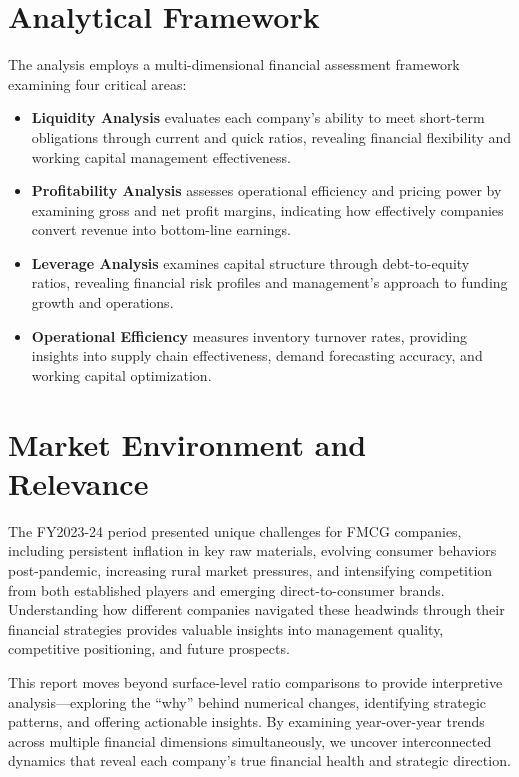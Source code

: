 \documentclass[12pt, a4paper]{report}
\begin{document}
\section{Analytical Framework}

The analysis employs a multi-dimensional financial assessment framework examining four critical areas:

\begin{itemize}
    \item \textbf{Liquidity Analysis} evaluates each company's ability to meet short-term obligations through current and quick ratios, revealing financial flexibility and working capital management effectiveness.
    
    \item \textbf{Profitability Analysis} assesses operational efficiency and pricing power by examining gross and net profit margins, indicating how effectively companies convert revenue into bottom-line earnings.
    
    \item \textbf{Leverage Analysis} examines capital structure through debt-to-equity ratios, revealing financial risk profiles and management's approach to funding growth and operations.
    
    \item \textbf{Operational Efficiency} measures inventory turnover rates, providing insights into supply chain effectiveness, demand forecasting accuracy, and working capital optimization.
\end{itemize}

\section{Market Environment and Relevance}

The FY2023-24 period presented unique challenges for FMCG companies, including persistent inflation in key raw materials, evolving consumer behaviors post-pandemic, increasing rural market pressures, and intensifying competition from both established players and emerging direct-to-consumer brands. Understanding how different companies navigated these headwinds through their financial strategies provides valuable insights into management quality, competitive positioning, and future prospects.

This report moves beyond surface-level ratio comparisons to provide interpretive analysis---exploring the ``why'' behind numerical changes, identifying strategic patterns, and offering actionable insights. By examining year-over-year trends across multiple financial dimensions simultaneously, we uncover interconnected dynamics that reveal each company's true financial health and strategic direction.
\end{document}
